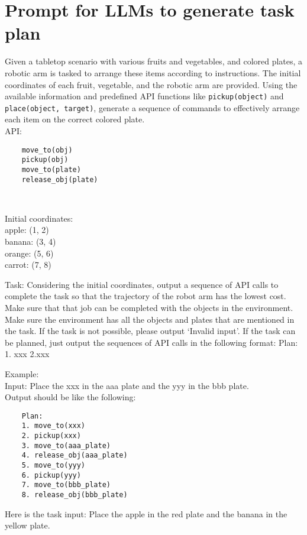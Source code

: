 \documentclass{article}
\begin{document}
\section*{Prompt for LLMs to generate task plan}%
    Given a tabletop scenario with various fruits and vegetables, and colored plates, a robotic arm is tasked to arrange these items according to instructions. The initial coordinates of each fruit, vegetable, and the robotic arm are provided. Using the available information and predefined API functions like \texttt{pickup(object)} and \texttt{place(object, target)}, generate a sequence of commands to effectively arrange each item on the correct colored plate.\\
    
    API: 
    \begin{verbatim}
    move_to(obj) 
    pickup(obj) 
    move_to(plate) 
    release_obj(plate)
    \end{verbatim}\\
    \vspace{1em}
    
    Initial coordinates: \\
    apple: (1, 2) \\
    banana: (3, 4) \\
    orange: (5, 6) \\
    carrot: (7, 8) 
    \vspace{1em}
    
    Task: 
    Considering the initial coordinates, output a sequence of API calls to complete the task so that the trajectory of the robot arm has the lowest cost. Make sure that that job can be completed with the objects in the environment. Make sure the environment has all the objects and plates that are mentioned in the task. If the task is not possible, please output `Invalid input'. If the task can be planned, just output the sequences of API calls in the following format: 
    Plan: 1. xxx 2.xxx 
    \vspace{1em}
    
    Example: \\
    Input: Place the xxx in the aaa plate and the yyy in the bbb plate. \\
    Output should be like the following:
    
    \begin{verbatim}
    Plan: 
    1. move_to(xxx)
    2. pickup(xxx)
    3. move_to(aaa_plate)
    4. release_obj(aaa_plate)
    5. move_to(yyy)
    6. pickup(yyy)
    7. move_to(bbb_plate)
    8. release_obj(bbb_plate)
    \end{verbatim}
    
    Here is the task input:  Place the apple in the red plate and the banana in the yellow plate. 
    
\end{document}
